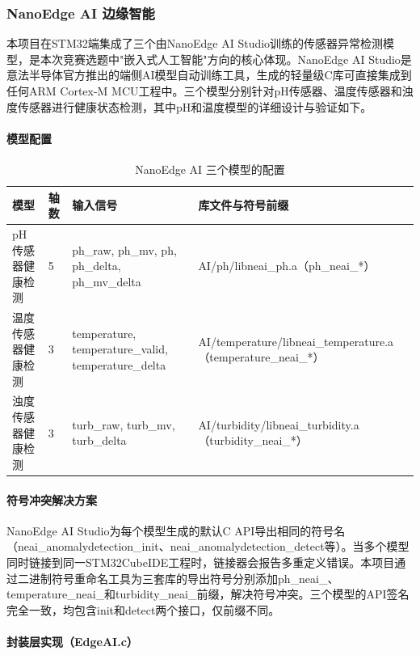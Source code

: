 \documentclass[12pt,a4paper]{ctexart}
\begin{document}
\subsubsection{NanoEdge AI 边缘智能}

本项目在STM32端集成了三个由NanoEdge AI Studio训练的传感器异常检测模型，是本次竞赛选题中"嵌入式人工智能"方向的核心体现。NanoEdge AI Studio是意法半导体官方推出的端侧AI模型自动训练工具，生成的轻量级C库可直接集成到任何ARM Cortex-M MCU工程中。三个模型分别针对pH传感器、温度传感器和浊度传感器进行健康状态检测，其中pH和温度模型的详细设计与验证如下。

\paragraph{模型配置}

\begin{table}[H]
\centering
\caption{NanoEdge AI 三个模型的配置}
\label{tab:neai}
\begin{tabular}{p{3.2cm}p{1.5cm}p{3cm}p{5cm}}
\toprule
\textbf{模型} & \textbf{轴数} & \textbf{输入信号} & \textbf{库文件与符号前缀} \\
\midrule
pH传感器健康检测 & 5 & ph\_raw, ph\_mv, ph, ph\_delta, ph\_mv\_delta & AI/ph/libneai\_ph.a（ph\_neai\_*） \\
温度传感器健康检测 & 3 & temperature, temperature\_valid, temperature\_delta & AI/temperature/libneai\_temperature.a（temperature\_neai\_*） \\
浊度传感器健康检测 & 3 & turb\_raw, turb\_mv, turb\_delta & AI/turbidity/libneai\_turbidity.a（turbidity\_neai\_*） \\
\bottomrule
\end{tabular}
\end{table}

\paragraph{符号冲突解决方案}

NanoEdge AI Studio为每个模型生成的默认C API导出相同的符号名（neai\_anomalydetection\_init、neai\_anomalydetection\_detect等）。当多个模型同时链接到同一STM32CubeIDE工程时，链接器会报告多重定义错误。本项目通过二进制符号重命名工具为三套库的导出符号分别添加ph\_neai\_、temperature\_neai\_和turbidity\_neai\_前缀，解决符号冲突。三个模型的API签名完全一致，均包含init和detect两个接口，仅前缀不同。

\paragraph{封装层实现（EdgeAI.c）}
\end{document}
